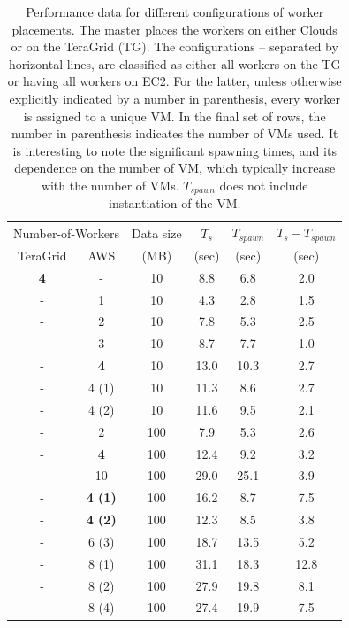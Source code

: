 \documentclass[conference,final]{IEEEtran}
\newcommand{\upp}{\vspace*{-0.6em}}
\begin{document}
\begin{table}
\upp
\begin{tabular}{cccccc}
  \hline
  \multicolumn{2}{c}{Number-of-Workers}  &  Data size   &  $T_s$  & $T_{spawn}$ & $T_s - T_{spawn}$\\   
  TeraGrid &  AWS &   (MB)  & (sec) & (sec)  & (sec) \\
  \hline
  { {\bf 4}} & - & 10  &  8.8 &  6.8 & 2.0 \\
  \hline 
  - & 1 & 10 & 4.3 & 2.8 & 1.5 \\
  - & 2 & 10 & 7.8 & 5.3 & 2.5 \\ 
  - & 3 & 10 & 8.7 & 7.7 & 1.0 \\
  - & {\bf 4} & 10 & 13.0 & 10.3 & 2.7 \\
  - & 4 (1) & 10 & 11.3 & 8.6 & 2.7 \\
  - & 4 (2) & 10 & 11.6 & 9.5 & 2.1 \\
  \hline 
  -  & 2  & 100 & 7.9  & 5.3 & 2.6 \\
  -  & {\bf 4}  & 100 & 12.4 & 9.2 & 3.2\\
  -  & 10 & 100 & 29.0 & 25.1 & 3.9 \\
  \hline
  - & {\bf 4 (1)} & 100 & 16.2 & 8.7 & 7.5 \\ 
  - & {\bf 4 (2)} & 100 & 12.3 & 8.5 & 3.8 \\
  - & 6 (3) & 100 & 18.7 & 13.5 & 5.2\\
  - & 8 (1) & 100 & 31.1 & 18.3 & 12.8 \\
  - & 8 (2) & 100 & 27.9 & 19.8 & 8.1\\
  - & 8 (4) & 100 & 27.4 & 19.9 & 7.5\\
  \hline \hline
\end{tabular}
\upp
\caption{Performance data for different configurations of worker placements. The master places the workers on either Clouds or on the TeraGrid (TG). The configurations -- separated by horizontal lines, are classified as either all workers on the TG or having all workers on EC2. For the latter, unless otherwise explicitly indicated
  by a number in parenthesis, every worker is assigned to a unique VM. In the
  final set of rows, the number  in parenthesis indicates the number of VMs used. It is interesting to note the significant spawning times, and its dependence on the number of VM, which typically increase with the number of VMs. $T_{spawn}$ does not include instantiation of the VM.}
\label{stuff-1}
\upp
\upp
\end{table}
\end{document}
